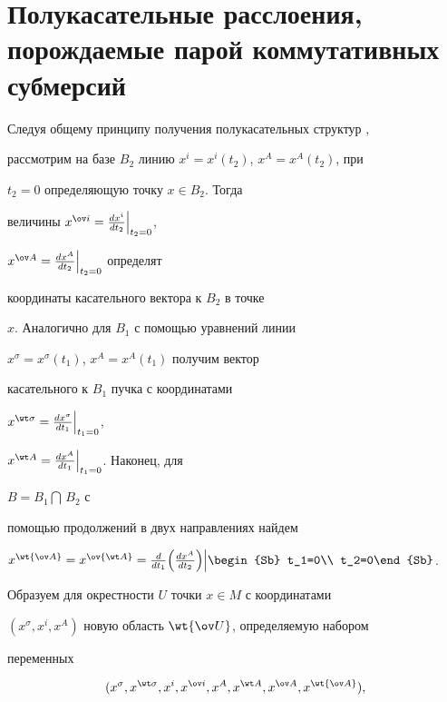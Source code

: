 \section{Полукасательные расслоения,\protect\\


порождаемые парой коммутативных субмерсий}





Следуя общему принципу получения полукасательных структур \cite{3},


рассмотрим на базе $B_2$ линию $x^i=x^i(t_2)$, $x^A=x^A(t_2)$, при


$t_2=0$ определяющую точку $x\in B_2$. Тогда


величины $x^{\ov i}=\frac{dx^i}{dt_2}\Big|_{t_2=0}$,


$x^{\ov A}=\frac{dx^A}{dt_2}\Big|_{t_2=0}$ определят


координаты касательного вектора к $B_2$ в точке


$x$. Аналогично для $B_1$ с помощью уравнений линии


$x^\sigma=x^\sigma(t_1)$, $x^A=x^A(t_1)$ получим вектор


касательного к $B_1$ пучка с координатами


$x^{\wt\sigma}=\frac{dx^\sigma}{dt_1}\Big|_{t_1=0}$,


$x^{\wt A}=\frac{dx^A}{dt_1}\Big|_{t_1=0}$. Наконец, для


$B=B_1\bigcap\,B_2$ с


помощью продолжений в двух направлениях найдем


$x^{\wt{\ov A}}=x^{\ov{\wt A}}=\frac{d}{dt_1}\Bigl(


\frac{dx^A}{dt_2}\Bigr)\Big|{\begin{Sb} t_1=0\\ t_2=0\end{Sb}}$.





Образуем для окрестности $U$ точки $x\in M$ с координатами


$(x^\sigma,x^i,x^A)$ новую область $\wt{\ov U}$, определяемую набором


переменных


\begin{equation}


(x^\sigma,x^{\wt\sigma},x^i,x^{\ov i},x^A,x^{\wt A},


x^{\ov A},x^{\wt{\ov A}}),


\end{equation}


